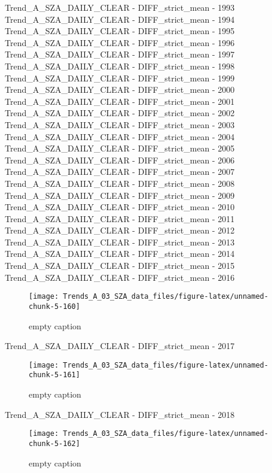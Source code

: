 \documentclass[
  10pt,
  a4paper,oneside]{article}
\begin{document}
Trend\_A\_SZA\_DAILY\_CLEAR - DIFF\_strict\_mean - 1993
Trend\_A\_SZA\_DAILY\_CLEAR - DIFF\_strict\_mean - 1994
Trend\_A\_SZA\_DAILY\_CLEAR - DIFF\_strict\_mean - 1995
Trend\_A\_SZA\_DAILY\_CLEAR - DIFF\_strict\_mean - 1996
Trend\_A\_SZA\_DAILY\_CLEAR - DIFF\_strict\_mean - 1997
Trend\_A\_SZA\_DAILY\_CLEAR - DIFF\_strict\_mean - 1998
Trend\_A\_SZA\_DAILY\_CLEAR - DIFF\_strict\_mean - 1999
Trend\_A\_SZA\_DAILY\_CLEAR - DIFF\_strict\_mean - 2000
Trend\_A\_SZA\_DAILY\_CLEAR - DIFF\_strict\_mean - 2001
Trend\_A\_SZA\_DAILY\_CLEAR - DIFF\_strict\_mean - 2002
Trend\_A\_SZA\_DAILY\_CLEAR - DIFF\_strict\_mean - 2003
Trend\_A\_SZA\_DAILY\_CLEAR - DIFF\_strict\_mean - 2004
Trend\_A\_SZA\_DAILY\_CLEAR - DIFF\_strict\_mean - 2005
Trend\_A\_SZA\_DAILY\_CLEAR - DIFF\_strict\_mean - 2006
Trend\_A\_SZA\_DAILY\_CLEAR - DIFF\_strict\_mean - 2007
Trend\_A\_SZA\_DAILY\_CLEAR - DIFF\_strict\_mean - 2008
Trend\_A\_SZA\_DAILY\_CLEAR - DIFF\_strict\_mean - 2009
Trend\_A\_SZA\_DAILY\_CLEAR - DIFF\_strict\_mean - 2010
Trend\_A\_SZA\_DAILY\_CLEAR - DIFF\_strict\_mean - 2011
Trend\_A\_SZA\_DAILY\_CLEAR - DIFF\_strict\_mean - 2012
Trend\_A\_SZA\_DAILY\_CLEAR - DIFF\_strict\_mean - 2013
Trend\_A\_SZA\_DAILY\_CLEAR - DIFF\_strict\_mean - 2014
Trend\_A\_SZA\_DAILY\_CLEAR - DIFF\_strict\_mean - 2015
Trend\_A\_SZA\_DAILY\_CLEAR - DIFF\_strict\_mean - 2016

\begin{figure}[!ht]

{\centering \texttt{[image: Trends\_A\_03\_SZA\_data\_files/figure-latex/unnamed-chunk-5-160]} 

}

\caption{ empty caption }\label{fig:unnamed-chunk-5-160}
\end{figure}

Trend\_A\_SZA\_DAILY\_CLEAR - DIFF\_strict\_mean - 2017

\begin{figure}[!ht]

{\centering \texttt{[image: Trends\_A\_03\_SZA\_data\_files/figure-latex/unnamed-chunk-5-161]} 

}

\caption{ empty caption }\label{fig:unnamed-chunk-5-161}
\end{figure}

Trend\_A\_SZA\_DAILY\_CLEAR - DIFF\_strict\_mean - 2018

\begin{figure}[!ht]

{\centering \texttt{[image: Trends\_A\_03\_SZA\_data\_files/figure-latex/unnamed-chunk-5-162]} 

}

\caption{ empty caption }\label{fig:unnamed-chunk-5-162}
\end{figure}
\end{document}
